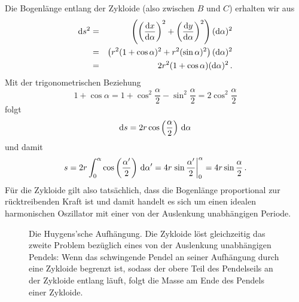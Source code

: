 Die Bogenl\"ange entlang der Zykloide (also zwischen $B$ und $C$) erhalten wir aus
\begin{eqnarray}
   {\rm d}s^2 &=& \left( \left( \frac{{\rm d} x}{{\rm d}\alpha} \right)^2 + \left( \frac{{\rm d} y}{{\rm d}\alpha} \right)^2 \right) 
                                     ({\rm d}\alpha)^2 \\ 
       &=&  \left( r^2 (1 + \cos \alpha)^2 + r^2 (\sin \alpha)^2 \right) ({\rm d}\alpha )^2 \\
       &=&   2 r^2 ( 1 + \cos \alpha) ({\rm d}\alpha )^2 \, .
\end{eqnarray}
Mit der trigonometrischen Beziehung
\begin{equation}
   1 + \cos \alpha = 1 + \cos^2 \frac{\alpha}{2} - \sin^2 \frac{\alpha}{2} = 2 \cos^2 \frac{\alpha}{2} 
\end{equation}
folgt
\begin{equation}
      {\rm d}s = 2r \cos \left( \frac{\alpha}{2} \right) \,  {\rm d} \alpha 
\end{equation}
und damit
\begin{equation}
      s = 2 r \int_0^\alpha \cos \left( \frac{\alpha'}{2} \right) \,  {\rm d} \alpha' = 
            4r  \left. \sin \frac{\alpha'}{2} \right|_0^\alpha = 4r \sin \frac{\alpha}{2}   \, .
\end{equation}
F\"ur die Zykloide gilt also tats\"achlich, dass die Bogenl\"ange proportional zur r\"ucktreibenden
Kraft ist und damit handelt es sich um einen idealen harmonischen Oszillator mit einer von der
Auslenkung unabh\"angigen Periode. 

\begin{figure}
\caption{\label{fig_Zykloide2}%
Die Huygens'sche Aufh\"an\-gung. Die Zykloide l\"ost gleichzeitig das zweite Problem bez\"uglich eines
von der Auslenkung unabh\"angigen Pendels: Wenn das schwingende Pendel an seiner Aufh\"angung
durch eine Zykloide begrenzt ist, sodass der obere Teil des Pendelseils an der Zykloide entlang
l\"auft, folgt die Masse am Ende des Pendels einer Zykloide.} 
\end{figure}

